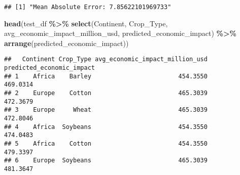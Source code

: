 \documentclass[
]{article}
\newenvironment{Shaded}{\begin{snugshade}}{\end{snugshade}}
\newcommand{\FunctionTok}[1]{\textcolor[rgb]{0.13,0.29,0.53}{\textbf{#1}}}
\newcommand{\NormalTok}[1]{#1}
\newcommand{\SpecialCharTok}[1]{\textcolor[rgb]{0.81,0.36,0.00}{\textbf{#1}}}
\begin{document}
\begin{verbatim}
## [1] "Mean Absolute Error: 7.85622101969733"
\end{verbatim}

\begin{Shaded}
\begin{Highlighting}[]
\FunctionTok{head}\NormalTok{(test\_df }\SpecialCharTok{\%\textgreater{}\%}
  \FunctionTok{select}\NormalTok{(Continent, Crop\_Type, avg\_economic\_impact\_million\_usd, predicted\_economic\_impact) }\SpecialCharTok{\%\textgreater{}\%}
  \FunctionTok{arrange}\NormalTok{(predicted\_economic\_impact))}
\end{Highlighting}
\end{Shaded}

\begin{verbatim}
##   Continent Crop_Type avg_economic_impact_million_usd predicted_economic_impact
## 1    Africa    Barley                        454.3550                  469.0314
## 2    Europe    Cotton                        465.3039                  472.3679
## 3    Europe     Wheat                        465.3039                  472.8046
## 4    Africa  Soybeans                        454.3550                  474.0483
## 5    Africa    Cotton                        454.3550                  479.3397
## 6    Europe  Soybeans                        465.3039                  481.3647
\end{verbatim}
\end{document}
